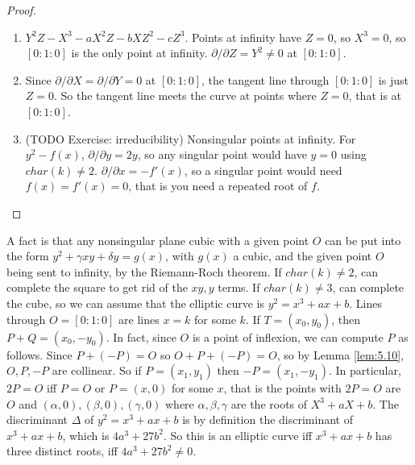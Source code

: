 \documentclass{article}
\newcommand{\rb}[1]{\left( #1 \right)}
\renewcommand{\sb}[1]{\left[ #1 \right]}
\theoremstyle{definition}\newtheorem{definition}{Definition}[section]
\theoremstyle{definition}\newtheorem{remark}[definition]{Remark}
\theoremstyle{definition}\newtheorem*{example}{Example}
\theoremstyle{definition}\newtheorem*{note}{Note}
\begin{document}
\begin{proof}
\hfill
\begin{enumerate}
\item $ Y^2Z - X^3 - aX^2Z - bXZ^2 - cZ^3 $. Points at infinity have $ Z = 0 $, so $ X^3 = 0 $, so $ \sb{0 : 1 : 0} $ is the only point at infinity. $ \partial / \partial Z = Y^2 \ne 0 $ at $ \sb{0 : 1 : 0} $.
\item Since $ \partial / \partial X = \partial / \partial Y = 0 $ at $ \sb{0 : 1 : 0} $, the tangent line through $ \sb{0 : 1 : 0} $ is just $ Z = 0 $. So the tangent line meets the curve at points where $ Z = 0 $, that is at $ \sb{0 : 1 : 0} $.
\item (TODO Exercise: irreducibility) Nonsingular points at infinity. For $ y^2 - f\rb{x} $, $ \partial / \partial y = 2y $, so any singular point would have $ y = 0 $ using $ char\rb{k} \ne 2 $. $ \partial / \partial x = -f'\rb{x} $, so a singular point would need $ f\rb{x} = f'\rb{x} = 0 $, that is you need a repeated root of $ f $.
\end{enumerate}
\end{proof}

A fact is that any nonsingular plane cubic with a given point $ O $ can be put into the form $ y^2 + \gamma xy + \delta y = g\rb{x} $, with $ g\rb{x} $ a cubic, and the given point $ O $ being sent to infinity, by the Riemann-Roch theorem. If $ char\rb{k} \ne 2 $, can complete the square to get rid of the $ xy, y $ terms. If $ char\rb{k} \ne 3 $, can complete the cube, so we can assume that the elliptic curve is $ y^2 = x^3 + ax + b $. Lines through $ O = \sb{0 : 1 : 0} $ are lines $ x = k $ for some $ k $. If $ T = \rb{x_0, y_0} $, then $ P + Q = \rb{x_0, -y_0} $. In fact, since $ O $ is a point of inflexion, we can compute $ P $ as follows. Since $ P + \rb{-P} = O $ so $ O + P + \rb{-P} = O $, so by Lemma \ref{lem:5.10}, $ O, P, -P $ are collinear. So if $ P = \rb{x_1, y_1} $ then $ -P = \rb{x_1, -y_1} $. In particular, $ 2P = O $ iff $ P = O $ or $ P = \rb{x, 0} $ for some $ x $, that is the points with $ 2P = O $ are $ O $ and $ \rb{\alpha, 0}, \rb{\beta, 0}, \rb{\gamma, 0} $ where $ \alpha, \beta, \gamma $ are the roots of $ X^3 + aX + b $. The discriminant $ \Delta $ of $ y^2 = x^3 + ax + b $ is by definition the discriminant of $ x^3 + ax + b $, which is $ 4a^3 + 27b^2 $. So this is an elliptic curve iff $ x^3 + ax + b $ has three distinct roots, iff $ 4a^3 + 27b^2 \ne 0 $.

\end{document}
